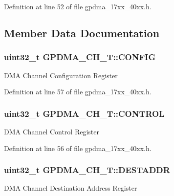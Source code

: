 Definition at line 52 of file gpdma\+\_\+17xx\+\_\+40xx.\+h.



\subsection{Member Data Documentation}
\subsubsection[{\texorpdfstring{C\+O\+N\+F\+IG}{CONFIG}}]{ uint32\+\_\+t G\+P\+D\+M\+A\+\_\+\+C\+H\+\_\+\+T\+::\+C\+O\+N\+F\+IG}\hypertarget{structGPDMA__CH__T_a4f74d11c01d0d3203ceeebd9db2a50a8}{}\label{structGPDMA__CH__T_a4f74d11c01d0d3203ceeebd9db2a50a8}
D\+MA Channel Configuration Register 

Definition at line 57 of file gpdma\+\_\+17xx\+\_\+40xx.\+h.

\subsubsection[{\texorpdfstring{C\+O\+N\+T\+R\+OL}{CONTROL}}]{ uint32\+\_\+t G\+P\+D\+M\+A\+\_\+\+C\+H\+\_\+\+T\+::\+C\+O\+N\+T\+R\+OL}\hypertarget{structGPDMA__CH__T_a7b2997d55e2bbe71c2f99d5879ca75c3}{}\label{structGPDMA__CH__T_a7b2997d55e2bbe71c2f99d5879ca75c3}
D\+MA Channel Control Register 

Definition at line 56 of file gpdma\+\_\+17xx\+\_\+40xx.\+h.

\subsubsection[{\texorpdfstring{D\+E\+S\+T\+A\+D\+DR}{DESTADDR}}]{ uint32\+\_\+t G\+P\+D\+M\+A\+\_\+\+C\+H\+\_\+\+T\+::\+D\+E\+S\+T\+A\+D\+DR}\hypertarget{structGPDMA__CH__T_ab61baba3fc08a7ba4b0502d043ed6ccd}{}\label{structGPDMA__CH__T_ab61baba3fc08a7ba4b0502d043ed6ccd}
D\+MA Channel Destination Address Register 

